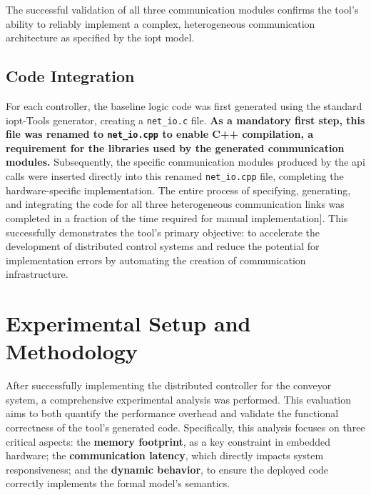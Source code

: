 The successful validation of all three communication modules confirms the tool's ability to reliably implement a complex, heterogeneous communication architecture as specified by the \gls{iopt} model.


\subsection{Code Integration}
\label{subsec:code_integration}

For each controller, the baseline logic code was first generated using the standard \gls{iopt}-Tools generator, creating a \texttt{net\_io.c} file. \textbf{As a mandatory first step, this file was renamed to \texttt{net\_io.cpp} to enable C++ compilation, a requirement for the libraries used by the generated communication modules.} Subsequently, the specific communication modules produced by the \gls{api} calls were inserted directly into this renamed \texttt{net\_io.cpp} file, completing the hardware-specific implementation. The entire process of specifying, generating, and integrating the code for all three heterogeneous communication links was completed in a fraction of the time required for manual implementation]. This successfully demonstrates the tool's primary objective: to accelerate the development of distributed control systems and reduce the potential for implementation errors by automating the creation of communication infrastructure.

\section{Experimental Setup and Methodology}
\label{sec:setup_and_methodology}

After successfully implementing the distributed controller for the conveyor system, a comprehensive experimental analysis was performed. This evaluation aims to both quantify the performance overhead and validate the functional correctness of the tool's generated code. Specifically, this analysis focuses on three critical aspects: the \textbf{memory footprint}, as a key constraint in embedded hardware; the \textbf{communication latency}, which directly impacts system responsiveness; and the \textbf{dynamic behavior}, to ensure the deployed code correctly implements the formal model's semantics.


